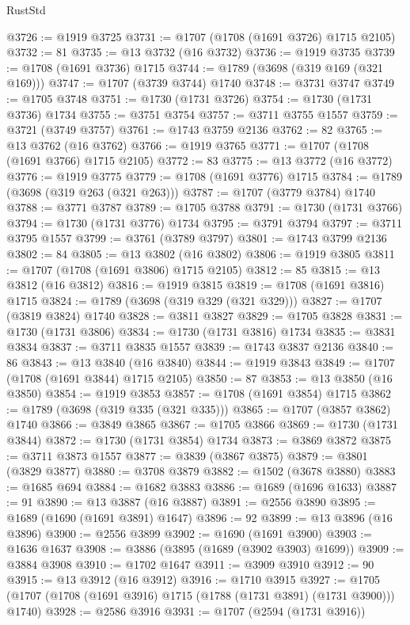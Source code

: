 \begin{lexlean}{RustStd}
\begin{coremodule}
@3726 := @1919 @3725
@3731 := @1707 (@1708 (@1691 @3726) @1715 @2105)
@3732 := 81
@3735 := @13 @3732 (@16 @3732)
@3736 := @1919 @3735
@3739 := @1708 (@1691 @3736) @1715
@3744 := @1789 (@3698 (@319 @169 (@321 @169)))
@3747 := @1707 (@3739 @3744) @1740
@3748 := @3731 @3747
@3749 := @1705 @3748
@3751 := @1730 (@1731 @3726)
@3754 := @1730 (@1731 @3736) @1734
@3755 := @3751 @3754
@3757 := @3711 @3755 @1557
@3759 := @3721 (@3749 @3757)
@3761 := @1743 @3759 @2136
@3762 := 82
@3765 := @13 @3762 (@16 @3762)
@3766 := @1919 @3765
@3771 := @1707 (@1708 (@1691 @3766) @1715 @2105)
@3772 := 83
@3775 := @13 @3772 (@16 @3772)
@3776 := @1919 @3775
@3779 := @1708 (@1691 @3776) @1715
@3784 := @1789 (@3698 (@319 @263 (@321 @263)))
@3787 := @1707 (@3779 @3784) @1740
@3788 := @3771 @3787
@3789 := @1705 @3788
@3791 := @1730 (@1731 @3766)
@3794 := @1730 (@1731 @3776) @1734
@3795 := @3791 @3794
@3797 := @3711 @3795 @1557
@3799 := @3761 (@3789 @3797)
@3801 := @1743 @3799 @2136
@3802 := 84
@3805 := @13 @3802 (@16 @3802)
@3806 := @1919 @3805
@3811 := @1707 (@1708 (@1691 @3806) @1715 @2105)
@3812 := 85
@3815 := @13 @3812 (@16 @3812)
@3816 := @1919 @3815
@3819 := @1708 (@1691 @3816) @1715
@3824 := @1789 (@3698 (@319 @329 (@321 @329)))
@3827 := @1707 (@3819 @3824) @1740
@3828 := @3811 @3827
@3829 := @1705 @3828
@3831 := @1730 (@1731 @3806)
@3834 := @1730 (@1731 @3816) @1734
@3835 := @3831 @3834
@3837 := @3711 @3835 @1557
@3839 := @1743 @3837 @2136
@3840 := 86
@3843 := @13 @3840 (@16 @3840)
@3844 := @1919 @3843
@3849 := @1707 (@1708 (@1691 @3844) @1715 @2105)
@3850 := 87
@3853 := @13 @3850 (@16 @3850)
@3854 := @1919 @3853
@3857 := @1708 (@1691 @3854) @1715
@3862 := @1789 (@3698 (@319 @335 (@321 @335)))
@3865 := @1707 (@3857 @3862) @1740
@3866 := @3849 @3865
@3867 := @1705 @3866
@3869 := @1730 (@1731 @3844)
@3872 := @1730 (@1731 @3854) @1734
@3873 := @3869 @3872
@3875 := @3711 @3873 @1557
@3877 := @3839 (@3867 @3875)
@3879 := @3801 (@3829 @3877)
@3880 := @3708 @3879
@3882 := @1502 (@3678 @3880)
@3883 := @1685 @694
@3884 := @1682 @3883
@3886 := @1689 (@1696 @1633)
@3887 := 91
@3890 := @13 @3887 (@16 @3887)
@3891 := @2556 @3890
@3895 := @1689 (@1690 (@1691 @3891) @1647)
@3896 := 92
@3899 := @13 @3896 (@16 @3896)
@3900 := @2556 @3899
@3902 := @1690 (@1691 @3900)
@3903 := @1636 @1637
@3908 := @3886 (@3895 (@1689 (@3902 @3903) @1699))
@3909 := @3884 @3908
@3910 := @1702 @1647
@3911 := @3909 @3910
@3912 := 90
@3915 := @13 @3912 (@16 @3912)
@3916 := @1710 @3915
@3927 := @1705 (@1707 (@1708 (@1691 @3916) @1715 (@1788 (@1731 @3891) (@1731 @3900))) @1740)
@3928 := @2586 @3916
@3931 := @1707 (@2594 (@1731 @3916))

\end{coremodule}
\end{lexlean}
